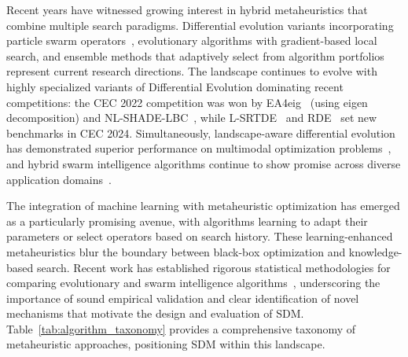 \documentclass[11pt]{article}
\begin{document}
Recent years have witnessed growing interest in hybrid metaheuristics that combine multiple search paradigms. Differential evolution variants incorporating particle swarm operators~\citep{das2016cultural}, evolutionary algorithms with gradient-based local search, and ensemble methods that adaptively select from algorithm portfolios represent current research directions. The landscape continues to evolve with highly specialized variants of Differential Evolution dominating recent competitions: the CEC 2022 competition was won by EA4eig~\cite{kumar2022ea4eig} (using eigen decomposition) and NL-SHADE-LBC~\cite{stanovov2022nlshadelbc}, while L-SRTDE~\cite{stanovov2024lsrtde} and RDE~\cite{tao2024rde} set new benchmarks in CEC 2024. Simultaneously, landscape-aware differential evolution has demonstrated superior performance on multimodal optimization problems~\citep{lin2024landscape}, and hybrid swarm intelligence algorithms continue to show promise across diverse application domains~\citep{tang2024survey}.

The integration of machine learning with metaheuristic optimization has emerged as a particularly promising avenue, with algorithms learning to adapt their parameters or select operators based on search history. These learning-enhanced metaheuristics blur the boundary between black-box optimization and knowledge-based search. Recent work has established rigorous statistical methodologies for comparing evolutionary and swarm intelligence algorithms~\citep{derrac2011practical}, underscoring the importance of sound empirical validation and clear identification of novel mechanisms that motivate the design and evaluation of SDM.
Table~\ref{tab:algorithm_taxonomy} provides a comprehensive taxonomy of metaheuristic approaches, positioning SDM within this landscape.
\end{document}
